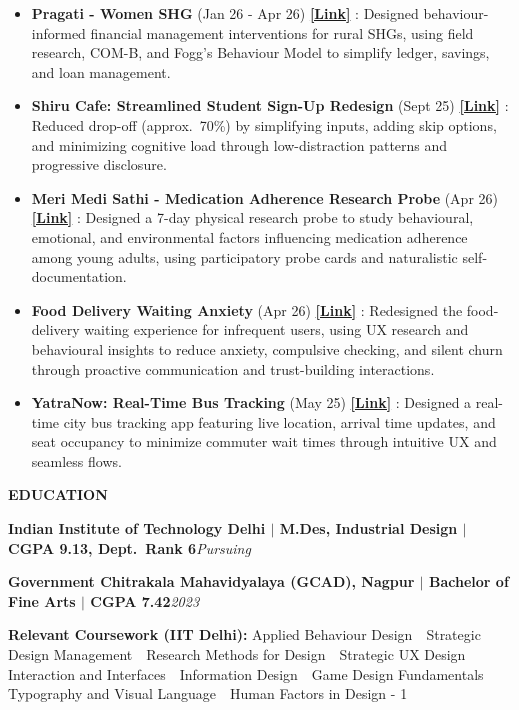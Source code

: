 \documentclass[10pt,a4paper]{article}
\newcommand{\cvsec}[1]{%
  \vspace{6pt}%
  {\color{accent}\large\bfseries\MakeUppercase{#1}}\par
  \vspace{1.5pt}{\color{ink}\hrule height 0.6pt}\vspace{4pt}\par
}
\newcommand{\entry}[2]{{\bfseries #1}\hfill{\itshape #2}\par\vspace{1.5pt}}
\newcommand{\plink}[2]{\href{#1}{\textcolor{accent}{\bfseries [#2]}}}
\begin{document}
\begin{itemize}
  \item \textbf{Pragati - Women SHG} (Jan 26 - Apr 26) \plink{https://www.behance.net/gallery/252922739/Mahila-Bachat-Gat-\%28Women-SHG\%29}{Link} : Designed behaviour-informed financial management interventions for rural SHGs, using field research, COM-B, and Fogg's Behaviour Model to simplify ledger, savings, and loan management.
  \item \textbf{Shiru Cafe: Streamlined Student Sign-Up Redesign} (Sept 25) \plink{https://www.behance.net/gallery/246940937/Streamlining-Shiru-Cafe-Sign-Up?platform=direct}{Link} : Reduced drop-off (approx.\ 70\%) by simplifying inputs, adding skip options, and minimizing cognitive load through low-distraction patterns and progressive disclosure.
  \item \textbf{Meri Medi Sathi - Medication Adherence Research Probe} (Apr 26) \plink{https://www.behance.net/gallery/249231125/Understanding-Medication-Adherence-in-Young-Adults}{Link} : Designed a 7-day physical research probe to study behavioural, emotional, and environmental factors influencing medication adherence among young adults, using participatory probe cards and naturalistic self-documentation.
  \item \textbf{Food Delivery Waiting Anxiety} (Apr 26) \plink{https://www.behance.net/gallery/256348969/Food-Delivery-Waiting-Anxiety?platform=direct}{Link} : Redesigned the food-delivery waiting experience for infrequent users, using UX research and behavioural insights to reduce anxiety, compulsive checking, and silent churn through proactive communication and trust-building interactions.
  \item \textbf{YatraNow: Real-Time Bus Tracking} (May 25) \plink{https://www.behance.net/gallery/256458789/Yatra-Now-Know-Before-You-Go?platform=direct}{Link} : Designed a real-time city bus tracking app featuring live location, arrival time updates, and seat occupancy to minimize commuter wait times through intuitive UX and seamless flows.
\end{itemize}

\cvsec{Education}

\entry{Indian Institute of Technology Delhi  $|$  M.Des, Industrial Design  $|$  CGPA 9.13, Dept.\ Rank 6}{Pursuing}
\entry{Government Chitrakala Mahavidyalaya (GCAD), Nagpur  $|$  Bachelor of Fine Arts  $|$  CGPA 7.42}{2023}
\vspace{1pt}
\textbf{Relevant Coursework (IIT Delhi):} Applied Behaviour Design \,\textperiodcentered\, Strategic Design Management \,\textperiodcentered\, Research Methods for Design \,\textperiodcentered\, Strategic UX Design \,\textperiodcentered\, Interaction and Interfaces \,\textperiodcentered\, Information Design \,\textperiodcentered\, Game Design Fundamentals \,\textperiodcentered\, Typography and Visual Language \,\textperiodcentered\, Human Factors in Design - 1
\end{document}
